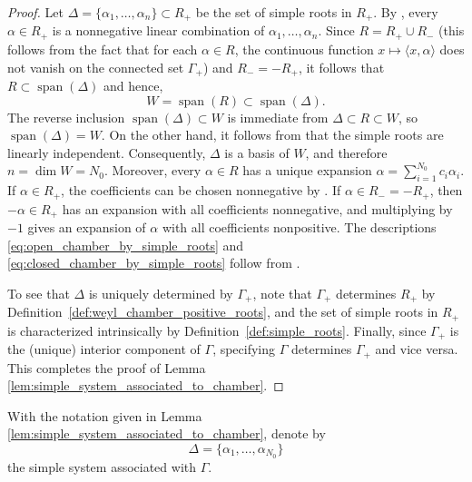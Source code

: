\documentclass[12pt]{amsart}
\begin{document}
\begin{proof}

Let $\Delta=\{\alpha_{1},\ldots,\alpha_{n}\}\subset R_{+}$ be the set of simple roots in $R_{+}$. By \cite[Proposition~2.10]{HeckmanCoxeterGroups}, every $\alpha\in R_{+}$
is a nonnegative linear combination of $\alpha_{1},\ldots,\alpha_{n}$. Since $R=R_{+}\cup R_{-}$ (this follows from the fact that for each $\alpha\in R$, the continuous function
$x\mapsto\langle x,\alpha\rangle$ does not vanish on the connected set $\Gamma_{+}$) and $R_{-}=-R_{+}$, it follows that
$R\subset\operatorname{span}(\Delta)$ and hence,
\[
W=\operatorname{span}(R)\subset\operatorname{span}(\Delta).
\]
The reverse inclusion $\operatorname{span}(\Delta)\subset W$ is immediate from $\Delta\subset R\subset W$,
so $\operatorname{span}(\Delta)=W$. On the other hand, it follows from \cite[Theorem~2.16]{HeckmanCoxeterGroups} that the simple roots are linearly
independent. Consequently, $\Delta$ is a basis
of $W$, and therefore $n=\dim W=N_{0}$. Moreover, every $\alpha\in R$ has a unique expansion
$\alpha=\sum_{i=1}^{N_{0}}c_{i}\alpha_{i}$. If $\alpha\in R_{+}$, the coefficients can be chosen
nonnegative by \cite[Proposition~2.10]{HeckmanCoxeterGroups}. If $\alpha\in R_{-}=-R_{+}$, then
$-\alpha\in R_{+}$ has an expansion with all coefficients nonnegative, and multiplying by $-1$ gives
an expansion of $\alpha$ with all coefficients nonpositive.
The descriptions \eqref{eq:open_chamber_by_simple_roots} and \eqref{eq:closed_chamber_by_simple_roots} follow from \cite[Corollary~2.11]{HeckmanCoxeterGroups}.


To see that $\Delta$ is uniquely determined by $\Gamma_+$, note that $\Gamma_+$ determines $R_{+}$
by Definition~\ref{def:weyl_chamber_positive_roots}, and the set of simple roots in $R_{+}$ is
characterized intrinsically by Definition~\ref{def:simple_roots}. Finally, since $\Gamma_+$ is the (unique) interior component of $\Gamma$, specifying $\Gamma$ determines $\Gamma_+$ and vice versa. This completes the proof of Lemma \ref{lem:simple_system_associated_to_chamber}.
\end{proof}
\begin{nota}
With the notation given in Lemma \ref{lem:simple_system_associated_to_chamber}, denote by
 $$\Delta=\{\alpha_{1},\ldots,\alpha_{N_{0}}\}$$ the simple system associated with $\Gamma$.
\end{nota}
\end{document}
